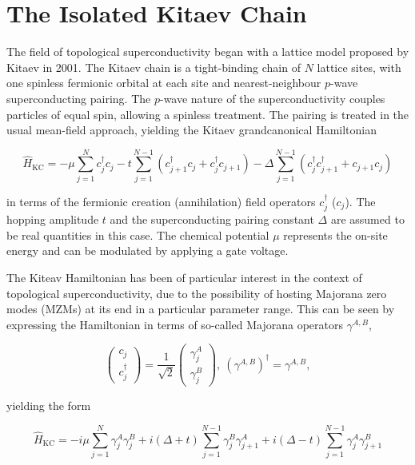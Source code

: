 \section{The Isolated Kitaev Chain}

The field of topological superconductivity began with a lattice model proposed by Kitaev in 2001. The Kitaev chain is a tight-binding chain of $N$ lattice sites, with one spinless fermionic orbital at each site and nearest-neighbour $p$-wave superconducting pairing. The $p$-wave nature of the superconductivity couples particles of equal spin, allowing a spinless treatment. The pairing is treated in the usual mean-field approach, yielding the Kitaev grandcanonical Hamiltonian

\begin{equation}
    \hat{H}_{\text{KC}} = -\mu \sum_{j=1}^{N}c^{\dagger}_{j}c_{j} - t\sum_{j=1}^{N-1}(c^{\dagger}_{j+1}c_{j}+c^{\dagger}_{j}c_{j+1})-\Delta \sum_{j=1}^{N-1}(c^{\dagger}_{j}c^{\dagger}_{j+1}+c_{j+1}c_{j})    
\end{equation}

in terms of the fermionic creation (annihilation) field operators $c^{\dagger}_{j}$ ($c_{j}$). The hopping amplitude $t$ and the superconducting pairing constant $\Delta$ are assumed to be real quantities in this case. The chemical potential $\mu$ represents the on-site energy and can be modulated by applying a gate voltage. \par 

The Kiteav Hamiltonian has been of particular interest in the context of topological superconductivity, due to the possibility of hosting Majorana zero modes (MZMs) at its end in a particular parameter range. This can be seen by expressing the Hamiltonian in terms of so-called Majorana operators $\gamma^{A,B}$,

\begin{equation}
    \begin{pmatrix}
        c_{j} \\
        c^{\dagger}_{j}    
    \end{pmatrix} = \frac{1}{\sqrt{2}}
    \begin{pmatrix}
        \gamma^{A}_{j} \\
        \gamma^{B}_{j}    
    \end{pmatrix}, \: (\gamma^{A,B})^{\dagger} = \gamma^{A,B},
\end{equation}

yielding the form

\begin{equation} \label{eq:majorana}
    \hat{H}_{\text{KC}} = -i\mu \sum_{j=1}^{N}\gamma^{A}_{j}\gamma^{B}_{j} + i(\Delta+t)\sum_{j=1}^{N-1}\gamma^{B}_{j}\gamma^{A}_{j+1}+i(\Delta-t)\sum_{j=1}^{N-1}\gamma^{A}_{j}\gamma^{B}_{j+1}  
\end{equation}

